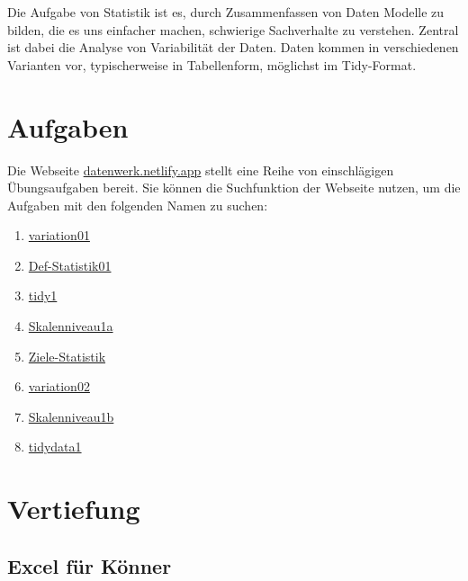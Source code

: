 \documentclass[
  letterpaper,
  twoside,
  open=any]{scrbook}
\providecommand{\tightlist}{%
  \setlength{\itemsep}{0pt}\setlength{\parskip}{0pt}}\usepackage{longtable,booktabs,array}
\theoremstyle{definition}
\theoremstyle{definition}
\theoremstyle{definition}
\theoremstyle{remark}
\begin{document}
Die Aufgabe von Statistik ist es, durch Zusammenfassen von Daten Modelle
zu bilden, die es uns einfacher machen, schwierige Sachverhalte zu
verstehen. Zentral ist dabei die Analyse von Variabilität der Daten.
Daten kommen in verschiedenen Varianten vor, typischerweise in
Tabellenform, möglichst im Tidy-Format.

\section{Aufgaben}\label{aufgaben}

Die Webseite \href{https://datenwerk.netlify.app}{datenwerk.netlify.app}
stellt eine Reihe von einschlägigen Übungsaufgaben bereit. Sie können
die Suchfunktion der Webseite nutzen, um die Aufgaben mit den folgenden
Namen zu suchen:

\begin{enumerate}
\def\labelenumi{\arabic{enumi}.}
\tightlist
\item
  \href{https://sebastiansauer.github.io/Datenwerk/posts/variation01/variation01.html}{variation01}
\item
  \href{https://sebastiansauer.github.io/Datenwerk/posts/def-statistik01/def-statistik01}{Def-Statistik01}
\item
  \href{https://sebastiansauer.github.io/Datenwerk/posts/tidy1/tidy1.html}{tidy1}
\item
  \href{https://sebastiansauer.github.io/Datenwerk/posts/skalenniveau1a/skalenniveau1a}{Skalenniveau1a}
\item
  \href{https://sebastiansauer.github.io/Datenwerk/posts/ziele-statistik/ziele-statistik}{Ziele-Statistik}
\item
  \href{https://sebastiansauer.github.io/Datenwerk/posts/variation02/variation02.html}{variation02}
\item
  \href{https://sebastiansauer.github.io/Datenwerk/posts/skalenniveau1b/skalenniveau1b}{Skalenniveau1b}
\item
  \href{https://sebastiansauer.github.io/Datenwerk/posts/tidydata1/tidydata1.html}{tidydata1}
\end{enumerate}

\section{Vertiefung}\label{vertiefung}

\subsection{Excel für Könner}\label{excel-fuxfcr-kuxf6nner}
\end{document}

